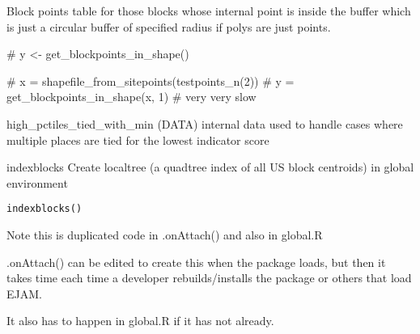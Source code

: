 \documentclass[a4paper]{book}
\begin{document}
%
\begin{Value}
Block points table for those blocks whose internal point is inside the buffer
which is just a circular buffer of specified radius if polys are just points.
\end{Value}
%
\begin{SeeAlso}\relax
{}  
\end{SeeAlso}
%
\begin{Examples}
\begin{ExampleCode}
 
  # y <- get_blockpoints_in_shape()
  
  # x = shapefile_from_sitepoints(testpoints_n(2))
  # y = get_blockpoints_in_shape(x, 1)  # very very slow
\end{ExampleCode}
\end{Examples}
%
\begin{Description}\relax
high\_pctiles\_tied\_with\_min (DATA) internal data used to handle cases where multiple places are tied for the lowest indicator score
\end{Description}
%
\begin{Description}\relax
indexblocks
Create localtree (a quadtree index of all US block centroids) in global environment
\end{Description}
%
\begin{Usage}
\begin{verbatim}
indexblocks()
\end{verbatim}
\end{Usage}
%
\begin{Details}\relax
Note this is duplicated code in .onAttach() and also in global.R

.onAttach() can be edited to create this when the package loads,
but then it takes time each time a developer rebuilds/installs the package or others that load EJAM.

It also has to happen in global.R if it has not already.
\end{Details}
\end{document}
